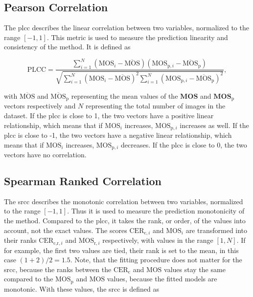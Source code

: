 \subsection{Pearson Correlation}
\label{subsec:pearson}

The \gls{plcc} \cite{pears_spear_2016} describes the linear correlation between two variables, normalized to the range $[-1, 1]$.
This metric is used to measure the prediction linearity and consistency of the method.
It is defined as

\begin{equation}
    \text{PLCC} = \frac{\sum_{i=1}^{N}{(\text{MOS}_{i}-\overline{\text{MOS}})(\text{MOS}_{\text{p},i}-\overline{\text{MOS}}_{\text{p}})}}{\sqrt{\sum_{i=1}^{N}{(\text{MOS}_{i}-\overline{\text{MOS}})^2}\sum_{i=1}^{N}{(\text{MOS}_{\text{p},i}-\overline{\text{MOS}}_{\text{p}})^2}}},
    \label{eq:pearson}
\end{equation}

with $\overline{\text{MOS}}$ and $\overline{\text{MOS}}_{\text{p}}$ representing the mean values of the $\mathbf{MOS}$ and $\mathbf{MOS}_{\text{p}}$ vectors respectively and $N$ representing the total number of images in the dataset.
If the \gls{plcc} is close to 1, the two vectors have a positive linear relationship, which means that if $\text{MOS}_{i}$ increases, $\text{MOS}_{\text{p},i}$ increases as well.
If the \gls{plcc} is close to -1, the two vectors have a negative linear relationship, which means that if $\text{MOS}_{i}$ increases, $\text{MOS}_{\text{p},i}$ decreases.
If the \gls{plcc} is close to 0, the two vectors have no correlation.

\subsection{Spearman Ranked Correlation}
\label{subsec:spearman}

The \gls{srcc} \cite{pears_spear_2016} describes the monotonic correlation between two variables, normalized to the range $[-1, 1]$.
Thus it is used to measure the prediction monotonicity of the method.
Compared to the \gls{plcc}, it takes the rank, or order, of the values into account, not the exact values.
The scores $\text{CER}_{\text{c},i}$ and $\text{MOS}_{i}$ are transformed into their ranks $\text{CER}_{\text{c,r},i}$ and $\text{MOS}_{\text{r},i}$ respectively, with values in the range $[1, N]$.
If for example, the first two values are tied, their rank is set to the mean, in this case $(1+2)/2 = 1.5$.
Note, that the fitting procedure does not matter for the \gls{srcc}, because the ranks between the $\text{CER}_{\text{c}}$ and $\text{MOS}$ values stay the same compared to the $\text{MOS}_{\text{p}}$ and $\text{MOS}$ values, because the fitted models are monotonic.
With these values, the \gls{srcc} is defined as

